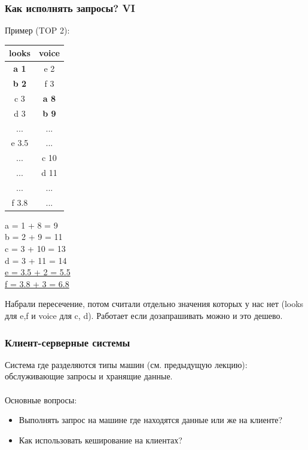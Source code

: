 \documentclass{beamer}
\begin{document}
\begin{frame}
\frametitle{Как исполнять запросы? VI}

Пример (TOP 2):

\begin{multicols}{2}
\begin{center}
	\begin{tabular}{ | c | c | }
		\hline
		looks & voice  \\ \hline
		\alert{\textbf{a 1}} & \alert{e 2} \\ \hline
		\alert{\textbf{b 2}} & \alert{f 3} \\ \hline
		\alert{c 3} & \alert{\textbf{a 8}} \\ \hline
		\alert{d 3} & \alert{\textbf{b 9}} \\ \hline \hline
		... & ... \\ \hline
		e 3.5       & ... \\ \hline
		... & c 10 \\ \hline
		... & d 11 \\ \hline
		... & ... \\ \hline		
		f 3.8 & ... \\ \hline
	\end{tabular}
\end{center}
	\columnbreak
a = 1 + 8 = 9\\
b = 2 + 9 = 11\\
c = 3 + 10 = 13\\
d = 3 + 11 = 14\\
\underline{e = 3.5 + 2 = 5.5}\\
\underline{f = 3.8 + 3 = 6.8}
	
\end{multicols}

Набрали пересечение, потом считали отдельно значения которых у нас нет (looks для e,f и voice для c, d). Работает если дозапрашивать можно и это дешево.


\end{frame}

\begin{frame}
\frametitle{Клиент-серверные системы}

Система где разделяются типы машин (см. предыдущую лекцию): обслуживающие запросы и хранящие данные.\\~\\

Основные вопросы:

\begin{itemize}
  \setlength\itemsep{1em}

  \item Выполнять запрос на машине где находятся данные или же на клиенте?
  \item Как использовать кеширование на клиентах?

\end{itemize}

\end{frame}
\end{document}
